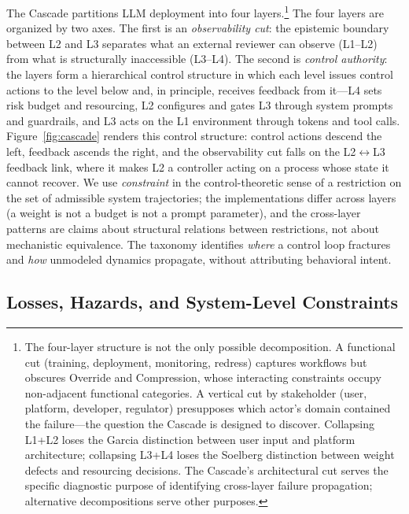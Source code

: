 \documentclass[11pt]{article}
\begin{document}
The Cascade partitions LLM deployment into four layers.\footnote{The four-layer structure is not the only possible decomposition. A functional cut (training, deployment, monitoring, redress) captures workflows but obscures Override and Compression, whose interacting constraints occupy non-adjacent functional categories. A vertical cut by stakeholder (user, platform, developer, regulator) presupposes which actor's domain contained the failure---the question the Cascade is designed to discover. Collapsing L1+L2 loses the Garcia distinction between user input and platform architecture; collapsing L3+L4 loses the Soelberg distinction between weight defects and resourcing decisions. The Cascade's architectural cut serves the specific diagnostic purpose of identifying cross-layer failure propagation; alternative decompositions serve other purposes.} The four layers are organized by two axes. The first is an \emph{observability cut}: the epistemic boundary between L2 and L3 separates what an external reviewer can observe (L1--L2) from what is structurally inaccessible (L3--L4). The second is \emph{control authority}: the layers form a hierarchical control structure in which each level issues control actions to the level below and, in principle, receives feedback from it---L4 sets risk budget and resourcing, L2 configures and gates L3 through system prompts and guardrails, and L3 acts on the L1 environment through tokens and tool calls. Figure~\ref{fig:cascade} renders this control structure: control actions descend the left, feedback ascends the right, and the observability cut falls on the L2$\leftrightarrow$L3 feedback link, where it makes L2 a controller acting on a process whose state it cannot recover. We use \textit{constraint} in the control-theoretic sense of a restriction on the set of admissible system trajectories; the implementations differ across layers (a weight is not a budget is not a prompt parameter), and the cross-layer patterns are claims about structural relations between restrictions, not about mechanistic equivalence. The taxonomy identifies \textit{where} a control loop fractures and \textit{how} unmodeled dynamics propagate, without attributing behavioral intent.

\subsection{Losses, Hazards, and System-Level Constraints}\label{sec:lhsc}
\end{document}
